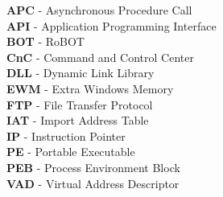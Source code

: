 \textbf{APC} - Asynchronous Procedure Call \\
\textbf{API} - Application Programming Interface \\
\textbf{BOT} - RoBOT \\
\textbf{CnC} - Command and Control Center \\
\textbf{DLL} - Dynamic Link Library \\
\textbf{EWM} - Extra Windows Memory \\
\textbf{FTP} - File Transfer Protocol \\
\textbf{IAT} - Import Address Table \\
\textbf{IP}  - Instruction Pointer \\
\textbf{PE}	 - Portable Executable \\
\textbf{PEB} - Process Environment Block \\
\textbf{VAD} - Virtual Address Descriptor \\